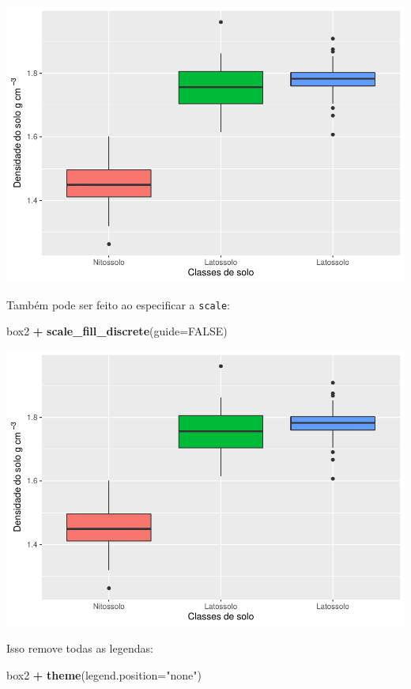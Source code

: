 \documentclass[
]{book}
\newenvironment{Shaded}{\begin{snugshade}}{\end{snugshade}}
\newcommand{\DataTypeTok}[1]{\textcolor[rgb]{0.13,0.29,0.53}{#1}}
\newcommand{\KeywordTok}[1]{\textcolor[rgb]{0.13,0.29,0.53}{\textbf{#1}}}
\newcommand{\NormalTok}[1]{#1}
\newcommand{\OperatorTok}[1]{\textcolor[rgb]{0.81,0.36,0.00}{\textbf{#1}}}
\newcommand{\OtherTok}[1]{\textcolor[rgb]{0.56,0.35,0.01}{#1}}
\newcommand{\StringTok}[1]{\textcolor[rgb]{0.31,0.60,0.02}{#1}}
\begin{document}
\includegraphics{TudodoR_files/figure-latex/unnamed-chunk-208-1.pdf}

Também pode ser feito ao especificar a \texttt{scale}:

\begin{Shaded}
\begin{Highlighting}[]
\NormalTok{box2 }\OperatorTok{+}\StringTok{ }\KeywordTok{scale_fill_discrete}\NormalTok{(}\DataTypeTok{guide=}\OtherTok{FALSE}\NormalTok{)}
\end{Highlighting}
\end{Shaded}

\includegraphics{TudodoR_files/figure-latex/unnamed-chunk-209-1.pdf}

Isso remove todas as legendas:

\begin{Shaded}
\begin{Highlighting}[]
\NormalTok{box2 }\OperatorTok{+}\StringTok{ }\KeywordTok{theme}\NormalTok{(}\DataTypeTok{legend.position=}\StringTok{"none"}\NormalTok{)}
\end{Highlighting}
\end{Shaded}
\end{document}
